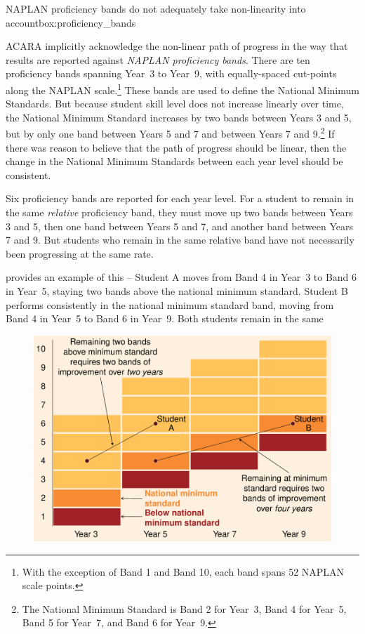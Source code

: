 \begin{bigbox*}{NAPLAN proficiency bands do not adequately take non-linearity into account}{box:proficiency_bands}
\raggedright

ACARA implicitly acknowledge the non-linear path of progress in the way that results are reported against \textit{NAPLAN proficiency bands}. There are ten proficiency bands spanning \mbox{Year 3} to \mbox{Year 9}, with equally-spaced cut-points along the NAPLAN scale.\footnote{With the exception of Band 1 and Band 10, each band spans 52 NAPLAN scale points.} These bands are used to define the National Minimum Standards. But because student skill level does not increase linearly over time, the National Minimum Standard increases by two bands between Years 3 and 5, but by only one band between Years 5 and 7 and between Years 7 and 9.\footnote{The National Minimum Standard is Band 2 for \mbox{Year 3}, Band 4 for \mbox{Year 5}, Band 5 for \mbox{Year 7}, and Band 6 for \mbox{Year 9}.} If there was reason to believe that the path of progress should be linear, then the change in the National Minimum Standards between each year level should be consistent. 

Six proficiency bands are reported for each year level. For a student to remain in the same \textit{relative} proficiency band, they must move up two bands between Years 3 and 5, then one band between Years 5 and 7, and another band between Years 7 and 9. But students who remain in the same relative band have not necessarily been progressing at the same rate.

 provides an example of this -- Student A moves from Band 4 in \mbox{Year 3} to Band 6 in \mbox{Year 5}, staying two bands above the national minimum standard. Student B performs consistently in the national minimum standard band, moving from Band 4 in \mbox{Year 5} to Band 6 in \mbox{Year 9}. Both students remain in the same

\begin{figure}[H]

 \includegraphics[width=\columnwidth]{atlas/NPB.pdf}\label{fig:npb}


\end{figure}
\end{bigbox*}
